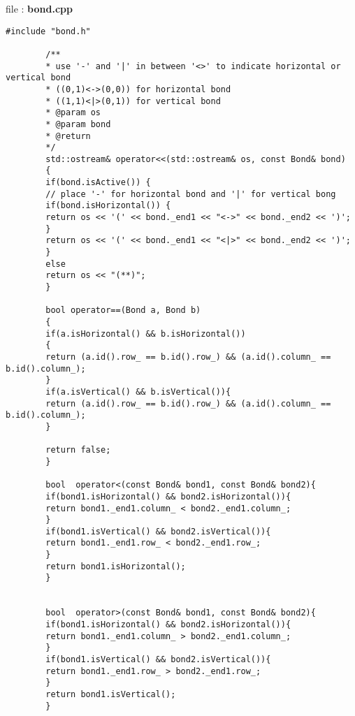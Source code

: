 	file : \textbf{bond.cpp}
	\begin{lstlisting}[style=CStyle]
		#include "bond.h"
		
		/**
		* use '-' and '|' in between '<>' to indicate horizontal or vertical bond
		* ((0,1)<->(0,0)) for horizontal bond
		* ((1,1)<|>(0,1)) for vertical bond
		* @param os
		* @param bond
		* @return
		*/
		std::ostream& operator<<(std::ostream& os, const Bond& bond)
		{
		if(bond.isActive()) {
		// place '-' for horizontal bond and '|' for vertical bong
		if(bond.isHorizontal()) {
		return os << '(' << bond._end1 << "<->" << bond._end2 << ')';
		}
		return os << '(' << bond._end1 << "<|>" << bond._end2 << ')';
		}
		else
		return os << "(**)";
		}
		
		bool operator==(Bond a, Bond b)
		{
		if(a.isHorizontal() && b.isHorizontal())
		{
		return (a.id().row_ == b.id().row_) && (a.id().column_ == b.id().column_);
		}
		if(a.isVertical() && b.isVertical()){
		return (a.id().row_ == b.id().row_) && (a.id().column_ == b.id().column_);
		}
		
		return false;
		}
		
		bool  operator<(const Bond& bond1, const Bond& bond2){
		if(bond1.isHorizontal() && bond2.isHorizontal()){
		return bond1._end1.column_ < bond2._end1.column_;
		}
		if(bond1.isVertical() && bond2.isVertical()){
		return bond1._end1.row_ < bond2._end1.row_;
		}
		return bond1.isHorizontal();
		}
		
		
		bool  operator>(const Bond& bond1, const Bond& bond2){
		if(bond1.isHorizontal() && bond2.isHorizontal()){
		return bond1._end1.column_ > bond2._end1.column_;
		}
		if(bond1.isVertical() && bond2.isVertical()){
		return bond1._end1.row_ > bond2._end1.row_;
		}
		return bond1.isVertical();
		}
	\end{lstlisting}
	
